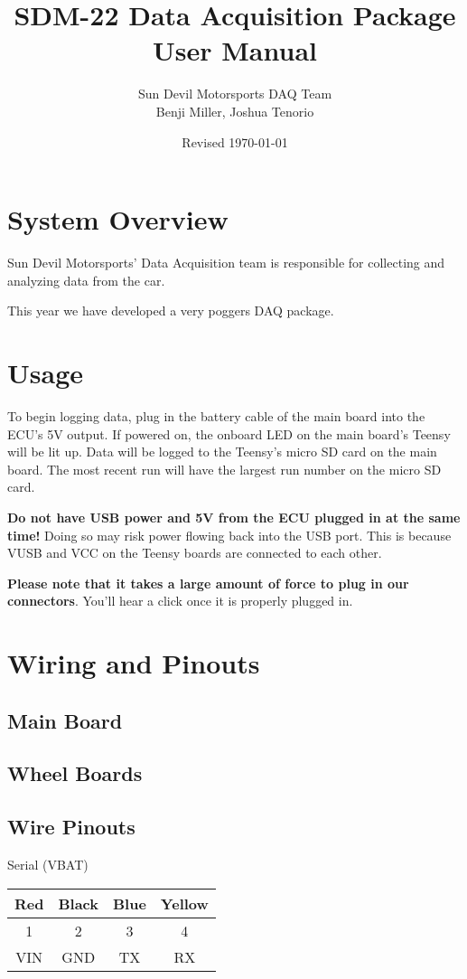 \documentclass[12pt]{article}
\title{SDM-22 Data Acquisition Package\\User Manual}
\author{Sun Devil Motorsports DAQ Team\\Benji Miller, Joshua Tenorio}
\date{Revised \today}
\begin{document}
\maketitle
\tableofcontents
\section{System Overview}
Sun Devil Motorsports' Data Acquisition team is responsible for collecting and analyzing data from the car.

This year we have developed a very poggers DAQ package.
\pagebreak
\section{Usage}
To begin logging data, plug in the battery cable of the main board into the ECU's 5V output.
If powered on, the onboard LED on the main board's Teensy will be lit up.
Data will be logged to the Teensy's micro SD card on the main board.
The most recent run will have the largest run number on the micro SD card.

\textbf{Do not have USB power and 5V from the ECU plugged in at the same time!}
Doing so may risk power flowing back into the USB port.
This is because VUSB and VCC on the Teensy boards are connected to each other.

\textbf{Please note that it takes a large amount of force to plug in our connectors}.
You'll hear a click once it is properly plugged in.
\section{Wiring and Pinouts}
\subsection{Main Board}
\subsection{Wheel Boards}
\subsection{Wire Pinouts}
Serial (VBAT)

\begin{tabular}{|c|c|c|c|}
\hline
Red & Black & Blue & Yellow \\
\hline
1 & 2 & 3 & 4 \\
\hline
VIN & GND & TX & RX \\
\hline
\end{tabular}
\vspace{1em}
\end{document}
